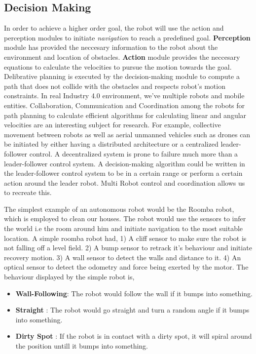 \subsection{Decision Making}
In order to achieve a higher order goal, the robot will use the action and perception modules to initiate \textit{navigation} to reach a predefined goal. 
\textbf{Perception} module has provided the neccesary information to the robot about the environment and location of obstacles. \textbf{Action} module provides 
the neccesary equations to calculate the velocities to pursue the motion towards the goal. Delibrative planning is executed by the decision-making module to compute a 
path that does not collide with the obstacles and respects robot's motion constraints. In real Industry 4.0 environment, we've multiple robots and mobile entities. Collaboration, Communication
and Coordination among the robots for path planning to calculate efficient algorithms for calculating linear and angular velocities are an interesting subject for research.
For example, collective movement between robots as well as aerial unmanned vehicles such as drones can be initiated by either having a distributed architecture or a centralized leader-follower control.
A decentralized system is prone to failure much more than a leader-follower control system. A decision-making algorithm could be written in the leader-follower control system to be in a certain range
or perform a certain action around the leader robot. Multi Robot control and coordination allows us to recreate this. 

The simplest example of an autonomous robot would be the Roomba robot, which is employed to clean our houses. The robot would use the sensors to infer the world i.e the room around him and 
initiate navigation to the most suitable location. A simple roomba robot had, 1) A cliff sensor to make sure the robot is not falling off a level field. 2) A bump sensor to retrack it's behaviour and initiate recovery motion. 3) A wall sensor to detect the walls and distance to it. 4) An optical sensor to detect the odometry and force being exerted by the motor.
The behaviour displayed by the simple robot is, 
\begin{itemize}
    \item \textbf{Wall-Following}: The robot would follow the wall if it bumps into something.
    \item \textbf{Straight} : The robot would go straight and turn a random angle if it bumps into something.
    \item \textbf{Dirty Spot} : If the robot is in contact with a dirty spot, it will spiral around the position untill it bumps into something.
\end{itemize}

